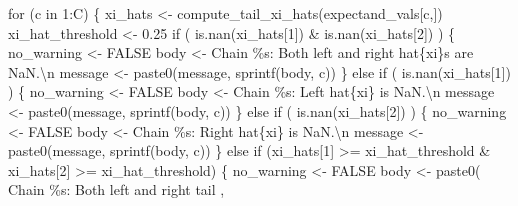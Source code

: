 \documentclass[
  letterpaper,
  DIV=11,
  numbers=noendperiod]{scrartcl}
\newenvironment{Shaded}{\begin{snugshade}}{\end{snugshade}}
\newcommand{\CharTok}[1]{\textcolor[rgb]{0.13,0.47,0.30}{#1}}
\newcommand{\ControlFlowTok}[1]{\textcolor[rgb]{0.00,0.23,0.31}{#1}}
\newcommand{\DecValTok}[1]{\textcolor[rgb]{0.68,0.00,0.00}{#1}}
\newcommand{\FloatTok}[1]{\textcolor[rgb]{0.68,0.00,0.00}{#1}}
\newcommand{\KeywordTok}[1]{\textcolor[rgb]{0.00,0.23,0.31}{#1}}
\newcommand{\NormalTok}[1]{\textcolor[rgb]{0.00,0.23,0.31}{#1}}
\newcommand{\OperatorTok}[1]{\textcolor[rgb]{0.37,0.37,0.37}{#1}}
\newcommand{\SpecialCharTok}[1]{\textcolor[rgb]{0.37,0.37,0.37}{#1}}
\newcommand{\StringTok}[1]{\textcolor[rgb]{0.13,0.47,0.30}{#1}}
\begin{document}
\begin{Shaded}
\begin{Highlighting}[]
  \ControlFlowTok{for}\NormalTok{ (c }\KeywordTok{in} \DecValTok{1}\NormalTok{:C) \{}
\NormalTok{    xi\_hats }\OperatorTok{\textless{}{-}}\NormalTok{ compute\_tail\_xi\_hats(expectand\_vals[c,])}
\NormalTok{    xi\_hat\_threshold }\OperatorTok{\textless{}{-}} \FloatTok{0.25}
    \ControlFlowTok{if}\NormalTok{ ( }\KeywordTok{is}\NormalTok{.nan(xi\_hats[}\DecValTok{1}\NormalTok{]) }\OperatorTok{\&} \KeywordTok{is}\NormalTok{.nan(xi\_hats[}\DecValTok{2}\NormalTok{]) ) \{}
\NormalTok{      no\_warning }\OperatorTok{\textless{}{-}}\NormalTok{ FALSE}
\NormalTok{      body }\OperatorTok{\textless{}{-}} \StringTok{\textquotesingle{}  Chain }\SpecialCharTok{\%s}\StringTok{: Both left and right hat}\SpecialCharTok{\{xi\}}\StringTok{s are NaN.}\CharTok{\textbackslash{}n}\StringTok{\textquotesingle{}}
\NormalTok{      message }\OperatorTok{\textless{}{-}}\NormalTok{ paste0(message, sprintf(body, c))}
\NormalTok{    \} }
    \ControlFlowTok{else} \ControlFlowTok{if}\NormalTok{ ( }\KeywordTok{is}\NormalTok{.nan(xi\_hats[}\DecValTok{1}\NormalTok{]) ) \{}
\NormalTok{      no\_warning }\OperatorTok{\textless{}{-}}\NormalTok{ FALSE}
\NormalTok{      body }\OperatorTok{\textless{}{-}} \StringTok{\textquotesingle{}  Chain }\SpecialCharTok{\%s}\StringTok{: Left hat}\SpecialCharTok{\{xi\}}\StringTok{ is NaN.}\CharTok{\textbackslash{}n}\StringTok{\textquotesingle{}}
\NormalTok{      message }\OperatorTok{\textless{}{-}}\NormalTok{ paste0(message, sprintf(body, c))}
\NormalTok{    \} }\ControlFlowTok{else} \ControlFlowTok{if}\NormalTok{ ( }\KeywordTok{is}\NormalTok{.nan(xi\_hats[}\DecValTok{2}\NormalTok{]) ) \{}
\NormalTok{      no\_warning }\OperatorTok{\textless{}{-}}\NormalTok{ FALSE}
\NormalTok{      body }\OperatorTok{\textless{}{-}} \StringTok{\textquotesingle{}  Chain }\SpecialCharTok{\%s}\StringTok{: Right hat}\SpecialCharTok{\{xi\}}\StringTok{ is NaN.}\CharTok{\textbackslash{}n}\StringTok{\textquotesingle{}}
\NormalTok{      message }\OperatorTok{\textless{}{-}}\NormalTok{ paste0(message, sprintf(body, c))}
\NormalTok{    \} }\ControlFlowTok{else} \ControlFlowTok{if}\NormalTok{ (xi\_hats[}\DecValTok{1}\NormalTok{] }\OperatorTok{\textgreater{}=}\NormalTok{ xi\_hat\_threshold }\OperatorTok{\&} 
\NormalTok{      xi\_hats[}\DecValTok{2}\NormalTok{] }\OperatorTok{\textgreater{}=}\NormalTok{ xi\_hat\_threshold) \{}
\NormalTok{      no\_warning }\OperatorTok{\textless{}{-}}\NormalTok{ FALSE}
\NormalTok{      body }\OperatorTok{\textless{}{-}}\NormalTok{ paste0(}\StringTok{\textquotesingle{}  Chain }\SpecialCharTok{\%s}\StringTok{: Both left and right tail \textquotesingle{}}\NormalTok{,}

\end{Highlighting}
\end{Shaded}
\end{document}
